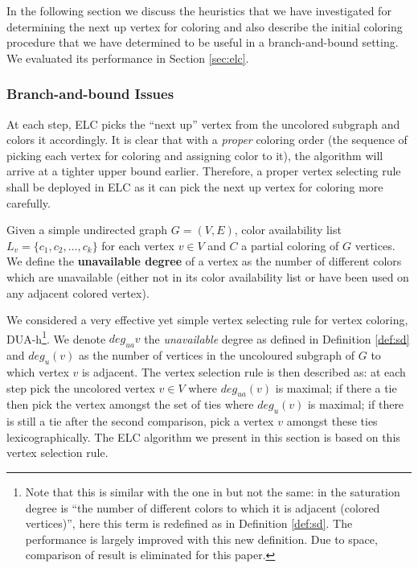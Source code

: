 \documentclass[10pt]{article}
\begin{document}
In the following section we discuss the heuristics that we have
investigated for determining the next up vertex for coloring and also describe
the initial coloring procedure that we have determined to be useful in a
branch-and-bound setting. We evaluated its performance in Section
\ref{sec:elc}.

\subsubsection{Branch-and-bound Issues}

At each step, ELC picks the ``next up'' vertex from the uncolored
subgraph and colors it accordingly.  It is clear that with a \textit{proper}
coloring order (the sequence of picking each vertex for coloring and assigning color to it), the algorithm will arrive at a tighter upper bound earlier.
Therefore, a proper vertex selecting rule shall be deployed in ELC as it can pick the
next up vertex for coloring more carefully.

\begin{mydef}\label{def:sd}
Given a simple undirected graph $G = (V, E)$, color availability list $L_v = \{c_1, c_2, ..., c_k\}$ for each vertex $v \in V$ and $C$ a partial coloring of $G$ vertices. We define the \textbf{unavailable degree} of a vertex as the number of different colors which are unavailable (either not in its color availability list or have been used on any adjacent colored vertex).
\end{mydef}

We considered a very effective yet simple vertex selecting rule for vertex
coloring, DUA-h\footnote{Note that this is similar with the one in \cite{Bre79} but not 
the same: in \cite{Bre79} the saturation degree is ``the number of different 
colors to which it is adjacent (colored vertices)'', here this term is redefined 
as in Definition \ref{def:sd}. The performance is largely improved with this
new definition. Due to space, comparison of result is eliminated for this paper.}.  We
denote $deg_{ua}{v}$ the \emph{unavailable} degree as defined in Definition 
\ref{def:sd} and $deg_u(v)$ as the number of vertices in the uncoloured 
subgraph of $G$ to which vertex $v$ is adjacent. The vertex selection rule is then described as:  at each step pick the uncolored vertex $v \in V$ where $deg_{ua}(v)$ is maximal; 
if there a tie then pick the vertex amongst the set of ties where $deg_u(v)$ is maximal;
if there is still a tie after the second comparison, 
pick a vertex $v$ amongst these ties lexicographically.
The ELC algorithm we present in this section is based on this vertex selection rule.
\end{document}
